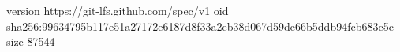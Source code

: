 version https://git-lfs.github.com/spec/v1
oid sha256:99634795b117e51a27172e6187d8f33a2eb38d067d59de66b5ddb94fcb683c5c
size 87544

